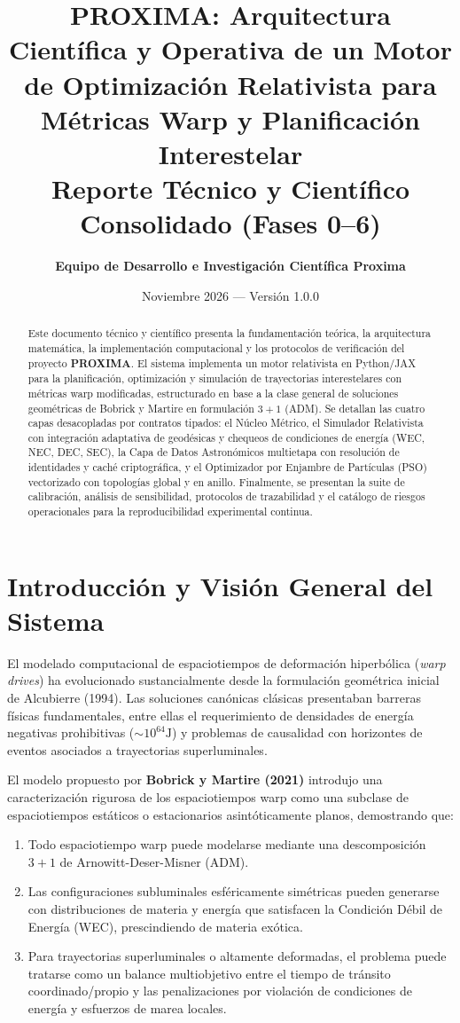 \documentclass[11pt,a4paper]{article}
\title{\textbf{PROXIMA: Arquitectura Científica y Operativa de un Motor de Optimización Relativista para Métricas Warp y Planificación Interestelar}\\
\large Reporte Técnico y Científico Consolidado (Fases 0--6)}
\author{\textbf{Equipo de Desarrollo e Investigación Científica Proxima}}
\date{Noviembre 2026 --- Versión 1.0.0}
\begin{document}
\maketitle

\begin{abstract}
Este documento técnico y científico presenta la fundamentación teórica, la arquitectura matemática, la implementación computacional y los protocolos de verificación del proyecto \textbf{PROXIMA}. El sistema implementa un motor relativista en Python/JAX para la planificación, optimización y simulación de trayectorias interestelares con métricas warp modificadas, estructurado en base a la clase general de soluciones geométricas de Bobrick y Martire en formulación $3+1$ (ADM). Se detallan las cuatro capas desacopladas por contratos tipados: el Núcleo Métrico, el Simulador Relativista con integración adaptativa de geodésicas y chequeos de condiciones de energía (WEC, NEC, DEC, SEC), la Capa de Datos Astronómicos multietapa con resolución de identidades y caché criptográfica, y el Optimizador por Enjambre de Partículas (PSO) vectorizado con topologías global y en anillo. Finalmente, se presentan la suite de calibración, análisis de sensibilidad, protocolos de trazabilidad y el catálogo de riesgos operacionales para la reproducibilidad experimental continua.
\end{abstract}

\tableofcontents
\newpage

\section{Introducción y Visión General del Sistema}

El modelado computacional de espaciotiempos de deformación hiperbólica (\textit{warp drives}) ha evolucionado sustancialmente desde la formulación geométrica inicial de Alcubierre (1994). Las soluciones canónicas clásicas presentaban barreras físicas fundamentales, entre ellas el requerimiento de densidades de energía negativas prohibitivas ($\sim 10^{64}\si{\joule}$) y problemas de causalidad con horizontes de eventos asociados a trayectorias superluminales. 

El modelo propuesto por \textbf{Bobrick y Martire (2021)} introdujo una caracterización rigurosa de los espaciotiempos warp como una subclase de espaciotiempos estáticos o estacionarios asintóticamente planos, demostrando que:
\begin{enumerate}
    \item Todo espaciotiempo warp puede modelarse mediante una descomposición $3+1$ de Arnowitt-Deser-Misner (ADM).
    \item Las configuraciones subluminales esféricamente simétricas pueden generarse con distribuciones de materia y energía que satisfacen la Condición Débil de Energía (WEC), prescindiendo de materia exótica.
    \item Para trayectorias superluminales o altamente deformadas, el problema puede tratarse como un balance multiobjetivo entre el tiempo de tránsito coordinado/propio y las penalizaciones por violación de condiciones de energía y esfuerzos de marea locales.
\end{enumerate}
\end{document}
